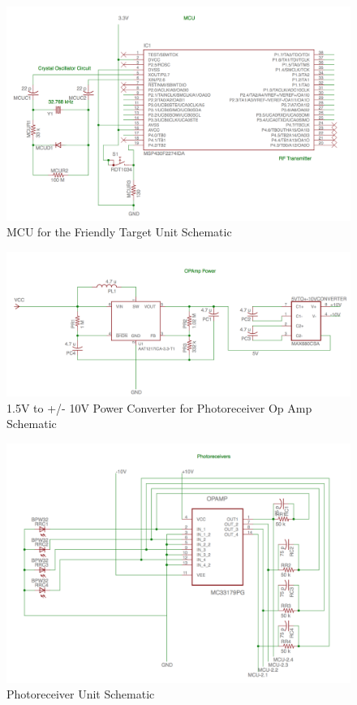 \documentclass[letterpaper,10pt]{article}
\begin{document}
\begin{spacing}{1.15}
\begin{figure} [H]
	\centering
	\includegraphics[scale=0.5]{MCU-Target.png}
	\caption{MCU for the Friendly Target Unit  Schematic\label{fig:mcu-target-schematic}}
\end{figure}

\begin{figure} [H]
	\centering
	\includegraphics[scale=0.5]{Op-Amp-Power.png}
	\caption{1.5V to  +/- 10V Power Converter for Photoreceiver Op Amp Schematic\label{fig:op-amp-power-schematic}}
\end{figure}

\begin{figure} [H]
	\centering
	\includegraphics[scale=0.65]{Photoreceiver.png}
	\caption{Photoreceiver Unit Schematic\label{fig:photoreceiver-schematic}}
\end{figure}


\end{spacing}
\end{document}
